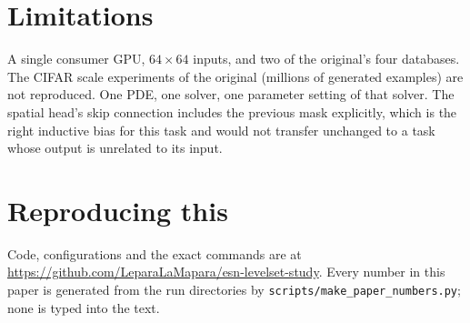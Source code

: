 \documentclass[11pt,a4paper]{article}
\begin{document}


\section{Limitations}

A single consumer GPU, $64 \times 64$ inputs, and two of the original's four
databases. The CIFAR scale experiments of the original (millions of generated
examples) are not reproduced. One PDE, one solver, one parameter setting of
that solver. The spatial head's skip connection includes the previous mask
explicitly, which is the right inductive bias for this task and would not
transfer unchanged to a task whose output is unrelated to its input.

\section{Reproducing this}

Code, configurations and the exact commands are at
\url{https://github.com/LeparaLaMapara/esn-levelset-study}. Every number in
this paper is generated from the run directories by
\texttt{scripts/make\_paper\_numbers.py}; none is typed into the text.
\end{document}
